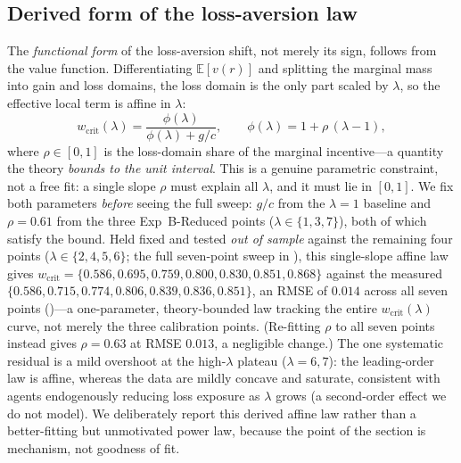 \documentclass[11pt]{article}
\newcommand{\wcrit}{w_{\mathrm{crit}}}
\begin{document}
\subsection{Derived form of the loss-aversion law}
The \emph{functional form} of the loss-aversion shift, not merely its sign,
follows from the value function. Differentiating $\mathbb{E}[v(r)]$ and
splitting the marginal mass into gain and loss domains, the loss domain is
the only part scaled by $\lambda$, so the effective local term is affine in
$\lambda$:
\begin{equation}
  \wcrit(\lambda)=\frac{\phi(\lambda)}{\phi(\lambda)+g/c},
  \qquad \phi(\lambda)=1+\rho\,(\lambda-1),
  \label{eq:wcrit_lambda}
\end{equation}
where $\rho\in[0,1]$ is the loss-domain share of the marginal incentive---a
quantity the theory \emph{bounds to the unit interval}. This is a genuine
parametric constraint, not a free fit: a single slope $\rho$ must explain
all $\lambda$, and it must lie in $[0,1]$. We fix both parameters
\emph{before} seeing the full sweep: $g/c$ from the $\lambda{=}1$ baseline
and $\rho=0.61$ from the three Exp~B-Reduced points
($\lambda\in\{1,3,7\}$), both of which satisfy the bound. Held fixed and
tested \emph{out of sample} against the remaining four points
($\lambda\in\{2,4,5,6\}$; the full seven-point sweep in
), this single-slope affine law gives
$\wcrit=\{0.586,0.695,0.759,0.800,0.830,0.851,0.868\}$ against the
measured $\{0.586,0.715,0.774,0.806,0.839,0.836,0.851\}$, an RMSE of $0.014$
across all seven points ()---a one-parameter, theory-bounded
law tracking the entire $\wcrit(\lambda)$ curve, not merely the three
calibration points. (Re-fitting $\rho$ to all seven points instead gives
$\rho=0.63$ at RMSE $0.013$, a negligible change.) The one systematic residual is a mild overshoot at the high-$\lambda$
plateau ($\lambda{=}6,7$): the leading-order law is affine, whereas the data are
mildly concave and saturate, consistent with agents endogenously reducing loss
exposure as $\lambda$ grows (a second-order effect we do not model). We deliberately report this derived affine law
rather than a better-fitting but unmotivated power law, because the point of
the section is mechanism, not goodness of fit.
\end{document}
